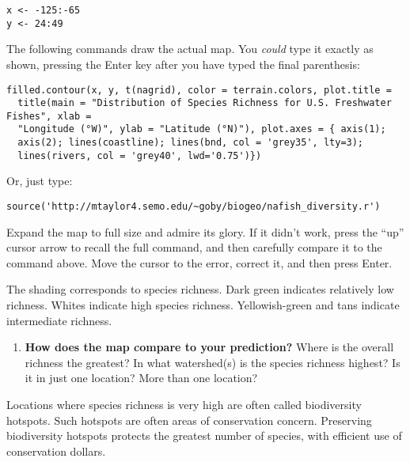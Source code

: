 \documentclass[11pt]{article}
\begin{document}
\begin{verbatim}
x <- -125:-65
y <- 24:49
\end{verbatim}

\newpage

The following commands draw the actual map. You \emph{could} type it exactly as
shown, pressing the Enter key after you have typed the final parenthesis:


\begin{verbatim}
filled.contour(x, y, t(nagrid), color = terrain.colors, plot.title =
  title(main = "Distribution of Species Richness for U.S. Freshwater Fishes", xlab =
  "Longitude (°W)", ylab = "Latitude (°N)"), plot.axes = { axis(1);
  axis(2); lines(coastline); lines(bnd, col = 'grey35', lty=3);
  lines(rivers, col = 'grey40', lwd='0.75')})
\end{verbatim}

Or, just type:

\begin{verbatim}
source('http://mtaylor4.semo.edu/~goby/biogeo/nafish_diversity.r')
\end{verbatim}

Expand the map to full size and admire its glory. If it didn't work, 
press the ``up'' cursor arrow to recall the full command, and then 
carefully compare it to the command above. Move the cursor to 
the error, correct it, and then press Enter.

The shading corresponds to species richness. Dark green indicates
relatively low richness. Whites indicate high species richness.
Yellowish-green and tans indicate intermediate richness.

\begin{enumerate}[resume, leftmargin=*]
\item \textbf{How does the map compare to your prediction?} Where is the overall
richness the greatest? In what watershed(s) is the species richness
highest? Is it in just one location? More than one location?\vspace{10\baselineskip}
\end{enumerate}

Locations where species richness is very high are often called
biodiversity hotspots. Such hotspots are often areas of conservation
concern. Preserving biodiversity hotspots protects the greatest number
of species, with efficient use of conservation dollars.
\end{document}
